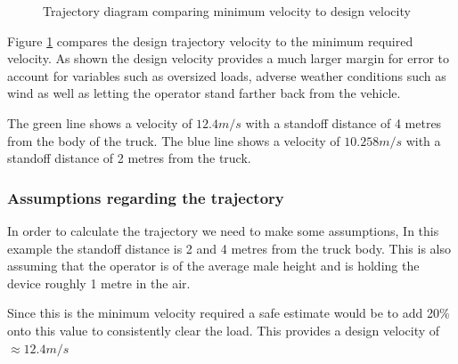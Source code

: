 \documentclass[a4paper,10pt]{article} %
\begin{document}
\begin{figure}[htbp!]
\caption{Trajectory diagram comparing minimum velocity to design velocity}
\label{fig:trajectory}
\end{figure}

\noindent Figure \ref{fig:trajectory} compares the design trajectory velocity to the minimum required velocity. As shown the design velocity provides a much larger margin for error to account for variables such as oversized loads, adverse weather conditions such as wind as well as letting the operator stand farther back from the vehicle. 

\medskip

The green line shows a velocity of $12.4m/s$ with a standoff distance of 4 metres from the body of the truck. The blue line shows a velocity of $10.258m/s$ with a standoff distance of 2 metres from the truck. 

\subsubsection{Assumptions regarding the trajectory}

In order to calculate the trajectory we need to make some assumptions, In this example the standoff distance is 2 and 4 metres from the truck body. This is also assuming that the operator is of the average male height and is holding the device roughly 1 metre in the air.

\medskip

Since this is the minimum velocity required a safe estimate would be to add 20\% onto this value to consistently clear the load. This provides a design velocity of \textbf{$\approx 12.4m/s$}
\end{document}
